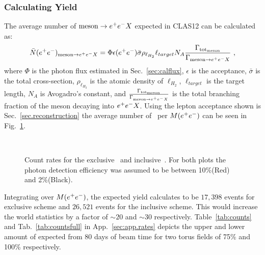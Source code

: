 \subsubsection{Calculating Yield}
The average number of $\mathrm{meson} \to e^+e^- X$ expected in CLAS12 can be calculated as:
\begin{align}
\bar{N}(e^+e^-)_{\mathrm{meson}  \to e^+e^- X} = \Phi \epsilon(e^+e^-)\bar{\sigma} \rho_{\ell_{H_2}}\ell_{target}N_A \frac{\Gamma_{\mathrm{tot}_\mathrm{meson} }}{\Gamma_{\mathrm{meson}  \to e^+e^- X}}\ ,
\end{align}
where $\Phi$ is the photon flux estimated in Sec.~\ref{sec:calflux}, $\epsilon$ is the acceptance, $\bar{\sigma}$ is the total cross-section, $\rho_{\ell_{H_2}}$ is the atomic density of $\ell_{H_2}$, $\ell_{target}$ is the target length, $N_A$ is Avogadro's constant, and $\frac{\Gamma_{\mathrm{tot}_\mathrm{meson}}}{\Gamma_{\mathrm{meson} \to e^+e^- X}}$ is the total branching fraction of the meson decaying into $e^+e^- X$.
Using the lepton acceptance shown is Sec.~\ref{sec.reconstruction} the average number of \etaTP \  per $M(e^+e^-)$ can be seen in Fig.~\ref{fig:etayield}.
 \begin{figure}[h!]\begin{center}
\\
\caption[Counts rates for \etaTP]{\label{fig:etayield}Count rates for the exclusive~ and inclusive~. For both plots the photon detection efficiency was assumed to be between 10\%(Red) and  2\%(Black). }
\end{center}\end{figure}
\FloatBarrier
Integrating over $M(e^+e^-)$, the expected yield calculates to be $17,398$ events for exclusive scheme and $26,521$ events for the inclusive scheme. This would increase the world statistics by a factor of $\sim 20$ and $\sim 30$ respectively. 
Table~\ref{tab:counts} and Tab.~\ref{tab:countsfull} in App.~\ref{sec:app.rates} depicts the upper and lower amount of \epemT expected from 80 days of beam time for two torus fields of 75\% and 100\% respectively.
\FloatBarrier
